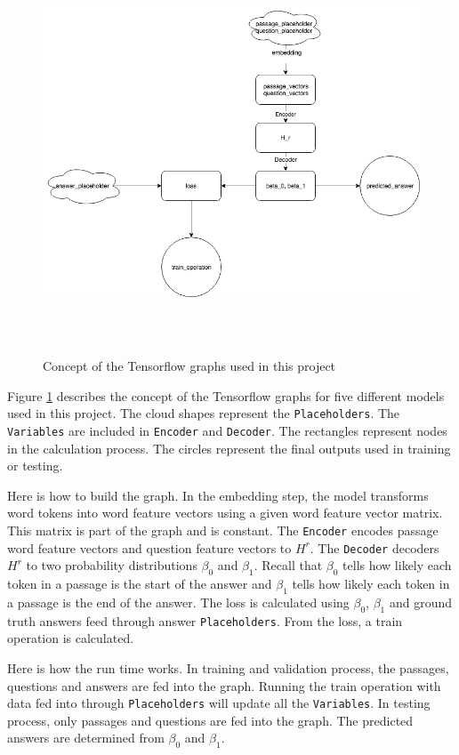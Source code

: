 \documentclass[modernstyle,12pt]{sjsuthesis}
\theoremstyle{definition}
\begin{document}
\begin{figure}[htbp]\centering
  \includegraphics[width=12cm, height=12cm]{figures/tf_graph.png}
  \caption{Concept of the Tensorflow graphs used in this project}
  \label{f:tf_graph}
\end{figure}

Figure \ref{f:tf_graph} describes the concept of the Tensorflow graphs for five different models used in this project. The cloud shapes represent the {\tt Placeholders}. The {\tt Variables} are included in {\tt Encoder} and {\tt Decoder}. The rectangles represent nodes in the calculation process. The circles represent the final outputs used in training or testing.

Here is how to build the graph. In the embedding step, the model transforms word tokens into word feature vectors using a given word feature vector matrix. This matrix is part of the graph and is constant. The {\tt Encoder} encodes passage word feature vectors and question feature vectors to $H^r$. The {\tt Decoder} decoders $H^r$ to two probability distributions $\beta _0$ and $\beta _1$. Recall that $\beta _0$ tells how likely each token in a passage is the start of the answer and $\beta _1$ tells how likely each token in a passage is the end of the answer. The loss is calculated using $\beta _0$, $\beta _1$ and ground truth answers feed through answer {\tt Placeholders}. From the loss, a train operation is calculated.

Here is how the run time works. In training and validation process, the passages, questions and answers are fed into the graph. Running the train operation with data fed into through {\tt Placeholders} will update all the {\tt Variables}. In testing process, only passages and questions are fed into the graph. The predicted answers are determined from $\beta _0$ and $\beta _1$.
\end{document}
